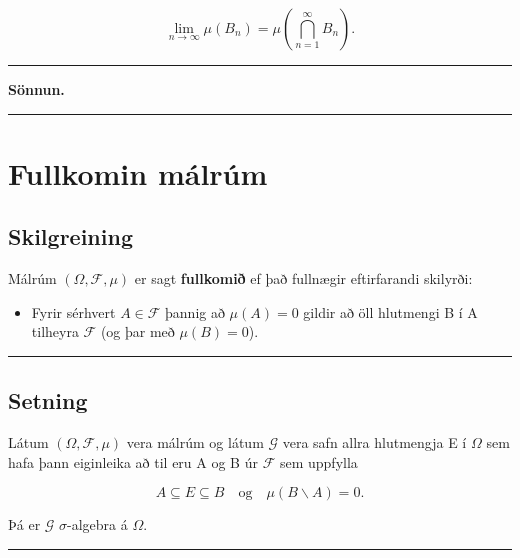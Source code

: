 \documentclass[]{book}
\providecommand{\tightlist}{%
  \setlength{\itemsep}{0pt}\setlength{\parskip}{0pt}}
\begin{document}
\[
\lim_{n\rightarrow\infty}\mu(B_n) = \mu\left(\bigcap_{n=1}^\infty B_n \right).
\]

\begin{center}\rule{0.5\linewidth}{\linethickness}\end{center}

\textbf{Sönnun.}

\begin{center}\rule{0.5\linewidth}{\linethickness}\end{center}

\hypertarget{fullkomin-malrum}{%
\chapter{Fullkomin málrúm}\label{fullkomin-malrum}}

\hypertarget{skilgreining-9}{%
\section{Skilgreining}\label{skilgreining-9}}

Málrúm \((\Omega, \mathcal F, \mu)\) er sagt \textbf{fullkomið} ef það fullnægir eftirfarandi skilyrði:

\begin{itemize}
\tightlist
\item
  Fyrir sérhvert \(A \in \mathcal F\) þannig að \(\mu(A) = 0\) gildir að öll hlutmengi B í A tilheyra \(\mathcal F\) (og þar með \(\mu(B) = 0\)).
\end{itemize}

\begin{center}\rule{0.5\linewidth}{\linethickness}\end{center}

\hypertarget{setning-28}{%
\section{Setning}\label{setning-28}}

Látum \((\Omega, \mathcal F, \mu)\) vera málrúm og látum \(\mathcal G\) vera safn allra hlutmengja E í \(\Omega\) sem hafa þann eiginleika að til eru A og B úr \(\mathcal F\) sem uppfylla

\[
A \subseteq E \subseteq B \quad \text{og} \quad \mu(B\backslash A) = 0.
\]

Þá er \(\mathcal G\) \(\sigma\)-algebra á \(\Omega\).

\begin{center}\rule{0.5\linewidth}{\linethickness}\end{center}
\end{document}
